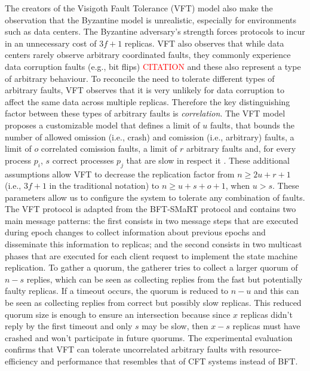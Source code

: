 \documentclass[runningheads,a4paper]{llncs}
\begin{document}
The creators of the Visigoth Fault Tolerance (VFT) model also make the observation that the Byzantine model is unrealistic, especially for environments such as data centers. The Byzantine adversary's strength forces protocols to incur in an unnecessary cost of $3f+1$ replicas. VFT also observes that while data centers rarely observe arbitrary coordinated faults, they commonly experience data corruption faults (e.g., bit flips) \textcolor{red}{CITATION} and these also represent a type of arbitrary behaviour. To reconcile the need to tolerate different types of arbitrary faults, VFT observes that it is very unlikely for data corruption to affect the same data across multiple replicas. Therefore the key distinguishing factor between these types of arbitrary faults is \textit{correlation}. The VFT model proposes a customizable model that defines a limit of $u$ faults, that bounds the number of allowed omission (i.e., crash) and comission (i.e., arbitrary) faults, a limit of $o$ correlated comission faults, a limit of $r$ arbitrary faults and, for every process $p_i$, $s$ correct processes $p_j$ that are slow in respect it \cite{Porto2015}. These additional assumptions allow VFT to decrease the replication factor from $n \geq 2u+r+1$ (i.e., $3f+1$ in the traditional notation) to $n \geq u+s+o+1$, when $u > s$. These parameters allow us to configure the system to tolerate any combination of faults. The VFT protocol is adapted from the BFT-SMaRT protocol and contains two main message patterns: the first consists in two message steps that are executed during epoch changes to collect information about previous epochs and disseminate this information to replicas; and the second consists in two  multicast phases that are executed for each client request to implement the state machine replication. To gather a quorum, the gatherer tries to collect a larger quorum of $n-s$ replies, which can be seen as collecting replies from the fast but potentially faulty replicas. If a timeout occurs, the quorum is reduced to $n-u$ and this can be seen as collecting replies from correct but possibly slow replicas. This reduced quorum size is enough to ensure an intersection because since $x$ replicas didn't reply by the first timeout and only $s$ may be slow, then $x-s$ replicas must have crashed and won't participate in future quorums. The experimental evaluation confirms that VFT can tolerate uncorrelated arbitrary faults with resource-efficiency and performance that resembles that of CFT systems instead of BFT. 
\end{document}
